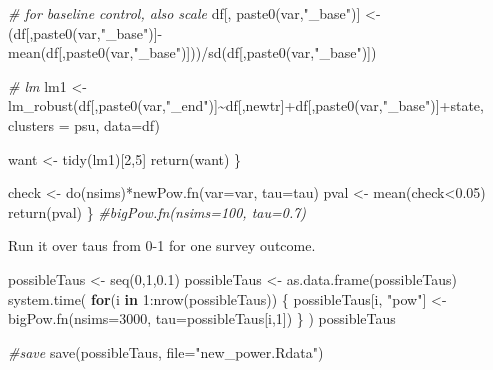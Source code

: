\documentclass[
]{article}
\newenvironment{Shaded}{\begin{snugshade}}{\end{snugshade}}
\newcommand{\AttributeTok}[1]{\textcolor[rgb]{0.77,0.63,0.00}{#1}}
\newcommand{\CommentTok}[1]{\textcolor[rgb]{0.56,0.35,0.01}{\textit{#1}}}
\newcommand{\ControlFlowTok}[1]{\textcolor[rgb]{0.13,0.29,0.53}{\textbf{#1}}}
\newcommand{\DecValTok}[1]{\textcolor[rgb]{0.00,0.00,0.81}{#1}}
\newcommand{\FloatTok}[1]{\textcolor[rgb]{0.00,0.00,0.81}{#1}}
\newcommand{\FunctionTok}[1]{\textcolor[rgb]{0.00,0.00,0.00}{#1}}
\newcommand{\NormalTok}[1]{#1}
\newcommand{\OtherTok}[1]{\textcolor[rgb]{0.56,0.35,0.01}{#1}}
\newcommand{\SpecialCharTok}[1]{\textcolor[rgb]{0.00,0.00,0.00}{#1}}
\newcommand{\StringTok}[1]{\textcolor[rgb]{0.31,0.60,0.02}{#1}}
\begin{document}
\begin{Shaded}
\begin{Highlighting}[]
  \CommentTok{\# for baseline control, also scale}
\NormalTok{  df[, }\FunctionTok{paste0}\NormalTok{(var,}\StringTok{"\_base"}\NormalTok{)] }\OtherTok{\textless{}{-}}\NormalTok{ (df[,}\FunctionTok{paste0}\NormalTok{(var,}\StringTok{"\_base"}\NormalTok{)]}\SpecialCharTok{{-}}\FunctionTok{mean}\NormalTok{(df[,}\FunctionTok{paste0}\NormalTok{(var,}\StringTok{"\_base"}\NormalTok{)]))}\SpecialCharTok{/}\FunctionTok{sd}\NormalTok{(df[,}\FunctionTok{paste0}\NormalTok{(var,}\StringTok{"\_base"}\NormalTok{)])}
  
  \CommentTok{\# lm}
\NormalTok{  lm1 }\OtherTok{\textless{}{-}} \FunctionTok{lm\_robust}\NormalTok{(df[,}\FunctionTok{paste0}\NormalTok{(var,}\StringTok{"\_end"}\NormalTok{)]}\SpecialCharTok{\textasciitilde{}}\NormalTok{df[,}\StringTok{\textquotesingle{}newtr\textquotesingle{}}\NormalTok{]}\SpecialCharTok{+}\NormalTok{df[,}\FunctionTok{paste0}\NormalTok{(var,}\StringTok{"\_base"}\NormalTok{)]}\SpecialCharTok{+}\NormalTok{state, }
                   \AttributeTok{clusters =}\NormalTok{ psu, }\AttributeTok{data=}\NormalTok{df)}
  
\NormalTok{  want }\OtherTok{\textless{}{-}} \FunctionTok{tidy}\NormalTok{(lm1)[}\DecValTok{2}\NormalTok{,}\DecValTok{5}\NormalTok{]}
  \FunctionTok{return}\NormalTok{(want)}
\NormalTok{  \}}
  
\NormalTok{  check }\OtherTok{\textless{}{-}} \FunctionTok{do}\NormalTok{(nsims)}\SpecialCharTok{*}\FunctionTok{newPow.fn}\NormalTok{(}\AttributeTok{var=}\NormalTok{var, }\AttributeTok{tau=}\NormalTok{tau)}
\NormalTok{  pval }\OtherTok{\textless{}{-}} \FunctionTok{mean}\NormalTok{(check}\SpecialCharTok{\textless{}}\FloatTok{0.05}\NormalTok{)}
  \FunctionTok{return}\NormalTok{(pval)}
\NormalTok{\}}
\CommentTok{\#bigPow.fn(nsims=100, tau=0.7)}
\end{Highlighting}
\end{Shaded}

Run it over taus from 0-1 for one survey outcome.

\begin{Shaded}
\begin{Highlighting}[]
\NormalTok{possibleTaus }\OtherTok{\textless{}{-}} \FunctionTok{seq}\NormalTok{(}\DecValTok{0}\NormalTok{,}\DecValTok{1}\NormalTok{,}\FloatTok{0.1}\NormalTok{)}
\NormalTok{possibleTaus }\OtherTok{\textless{}{-}} \FunctionTok{as.data.frame}\NormalTok{(possibleTaus)}
\FunctionTok{system.time}\NormalTok{(}
\ControlFlowTok{for}\NormalTok{(i }\ControlFlowTok{in} \DecValTok{1}\SpecialCharTok{:}\FunctionTok{nrow}\NormalTok{(possibleTaus))}
\NormalTok{\{}
\NormalTok{  possibleTaus[i, }\StringTok{"pow"}\NormalTok{] }\OtherTok{\textless{}{-}} \FunctionTok{bigPow.fn}\NormalTok{(}\AttributeTok{nsims=}\DecValTok{3000}\NormalTok{, }\AttributeTok{tau=}\NormalTok{possibleTaus[i,}\DecValTok{1}\NormalTok{])}
\NormalTok{\}}
\NormalTok{)}
\NormalTok{possibleTaus}

\CommentTok{\#save}
\FunctionTok{save}\NormalTok{(possibleTaus, }\AttributeTok{file=}\StringTok{"new\_power.Rdata"}\NormalTok{)}
\end{Highlighting}
\end{Shaded}
\end{document}

